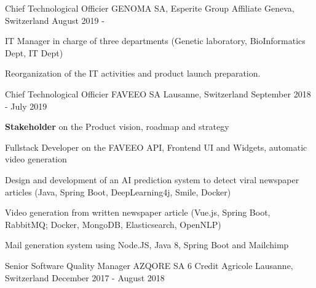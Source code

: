 

\begin{cventries}
        \cventry
        {Chief Technological Officier} %
        {GENOMA SA, Esperite Group Affiliate} %
        {Geneva, Switzerland} %
        {August 2019 - } %
        {
            \begin{cvitems} %
                \item{IT Manager in charge of three departments (Genetic laboratory, BioInformatics Dept, IT Dept)}
                \item{Reorganization of the IT activities and product launch preparation.}
            \end{cvitems}
        }
    \cventry
    {Chief Technological Officier} %
    {FAVEEO SA} %
    {Lausanne, Switzerland} %
    {September 2018 - July 2019} %
    {
        \begin{cvitems} %
            \item{\textbf{Stakeholder} on the Product vision, roadmap and strategy}
            \item{Fullstack Developer on the FAVEEO API, Frontend UI and Widgets, automatic video generation}
            \item{Design and development of an AI prediction system to detect viral newspaper articles (Java, Spring Boot, DeepLearning4j, Smile, Docker)}
            \item{Video generation from written newspaper article (Vue.js, Spring Boot, RabbitMQ; Docker, MongoDB, Elasticsearch, OpenNLP)}
            \item{Mail generation system using Node.JS, Java 8, Spring Boot and Mailchimp}
        \end{cvitems}
    }
    \cventry
    {Senior Software Quality Manager} %
    {AZQORE SA 6 Credit Agricole} %
    {Lausanne, Switzerland} %
    {December 2017 - August 2018} %
    {
        \begin{cvitems} %

\end{cvitems}}
\end{cventries}
